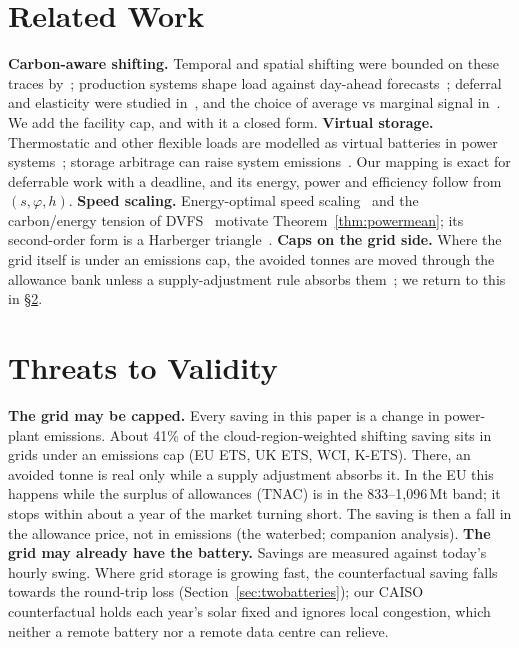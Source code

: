 \documentclass[acmsmall,review,anonymous]{acmart}
\theoremstyle{definition}
\begin{document}
\section{Related Work}
\textbf{Carbon-aware shifting.} Temporal and spatial shifting were bounded on these traces
by~\cite{sukprasert2024on}; production systems shape load against day-ahead
forecasts~\cite{radovanovic2021carbonaware}; deferral and elasticity were studied
in~\cite{wiesner2021lets,hanafy2024carbonscaler,souza2023ecovisor}, and the choice of average vs
marginal signal in~\cite{sukprasert2024onb,gorka2024electricityemissionsjl}. We add the facility
cap, and with it a closed form.
\textbf{Virtual storage.} Thermostatic and other flexible loads are modelled as virtual batteries
in power systems~\cite{callaway2011achieving,hao2015aggregate}; storage arbitrage can raise
system emissions~\cite{hittinger2015bulk}. Our mapping is exact for deferrable work with a
deadline, and its energy, power and efficiency follow from $(s,\varphi,h)$.
\textbf{Speed scaling.} Energy-optimal speed scaling~\cite{yao1995a} and the carbon/energy
tension of DVFS~\cite{hanafy2023the} motivate Theorem~\ref{thm:powermean}; its second-order form is
a Harberger triangle~\cite{harberger1964the}.
\textbf{Caps on the grid side.} Where the grid itself is under an emissions cap, the avoided
tonnes are moved through the allowance bank unless a supply-adjustment rule absorbs
them~\cite{perino2018new,rosendahl2019eu,perino2019overlapping}; we return to this in
\S\ref{sec:threats}.

\section{Threats to Validity}
\label{sec:threats}
\textbf{The grid may be capped.} Every saving in this paper is a change in power-plant
emissions. About 41\% of the cloud-region-weighted shifting saving sits in grids under an
emissions cap (EU ETS, UK ETS, WCI, K-ETS). There, an avoided tonne is real only while a supply
adjustment absorbs it. In the EU this happens while the surplus of allowances (TNAC) is in the
833--1{,}096\,Mt band; it stops within about a year of the market turning short. The saving is
then a fall in the allowance price, not in emissions (the waterbed; companion analysis).
\textbf{The grid may already have the battery.} Savings are measured against today's hourly
swing. Where grid storage is growing fast, the counterfactual saving falls towards the
round-trip loss (Section~\ref{sec:twobatteries}); our CAISO counterfactual holds each year's
solar fixed and ignores local congestion, which neither a remote battery nor a remote data
centre can relieve.
\end{document}
